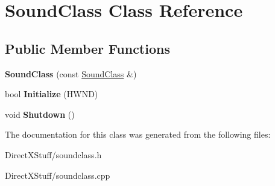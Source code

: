 \hypertarget{class_sound_class}{\section{Sound\-Class Class Reference}
\label{class_sound_class}
}
\subsection*{Public Member Functions}
\begin{DoxyCompactItemize}
\item 
\hypertarget{class_sound_class_a43f8d272d9f06feee52dbfe1d1ba74ab}{{\bfseries Sound\-Class} (const \hyperlink{class_sound_class}{Sound\-Class} \&)}\label{class_sound_class_a43f8d272d9f06feee52dbfe1d1ba74ab}

\item 
\hypertarget{class_sound_class_acef9c054a7013113b62e5c3d56b0d508}{bool {\bfseries Initialize} (H\-W\-N\-D)}\label{class_sound_class_acef9c054a7013113b62e5c3d56b0d508}

\item 
\hypertarget{class_sound_class_ab01d0ced224a2cac695f76e59c95ffa1}{void {\bfseries Shutdown} ()}\label{class_sound_class_ab01d0ced224a2cac695f76e59c95ffa1}

\end{DoxyCompactItemize}


The documentation for this class was generated from the following files\-:\begin{DoxyCompactItemize}
\item 
Direct\-X\-Stuff/soundclass.\-h\item 
Direct\-X\-Stuff/soundclass.\-cpp\end{DoxyCompactItemize}
